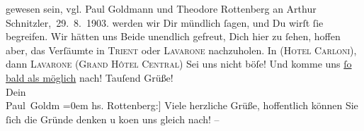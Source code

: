\begin{ledgroupsized}[t]{13cm}
{{{                  gewesen sein, vgl. Paul Goldmann und Theodore Rottenberg an Arthur
               Schnitzler, 29. 8. 1903.}}}\label{K_L03384-2h}
               werden wir Dir mündlich ſagen, und Du wirſt ſie begreifen. Wir hätten uns Beide
               unendlich gefreut, Dich hier zu ſehen, hoffen aber, das Verſäumte in \textsc{Trient}{ } oder \textsc{Lavarone}{ }nachzuholen. In \label{K_L03384-3v}\label{K_L03384-3h} (\textsc{Hotel Carloni}), dann \textsc{Lavarone} (\textsc{Grand Hôtel Central})\pend
           \pstart
           {\pb}Sei uns nicht böſe! Und komme uns \uline{ſo bald als möglich} nach!\pend
           \pstart
           Tauſend Grüße! {\\[\baselineskip]}Dein {\\[\baselineskip]}\spacefill\mbox{Paul Goldm}\pend
           \leftskip=0em{}\pstart
           \noindent{}{[}hs. Rottenberg:{]} Viele herzliche Grüße, hoffentlich können Sie ſich
                  die Gründe denken u ko{\geminationm}en uns gleich nach! –\pend
           
         
         \endnumbering{}\end{ledgroupsized}\begin{anhang}\end{anhang}\newcommand{\dateiname}{L03384}\newcommand{\titel}{Paul Goldmann und Theodore Rottenberg an Arthur Schnitzler, 18. 8. [1903]}\newcommand{\editorInnen}{Martin Anton Müller und Laura Untner}
      